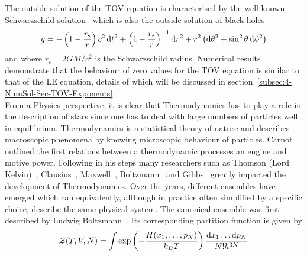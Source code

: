 The outside solution of the \ac{TOV} equation is characterised by the well known Schwarzschild solution~\cite{schwarzschildUberGravitationsfeldMassenpunktes1916} which is also the outside solution of black holes
\begin{equation}
	g=-\left(1-\frac{r_{\mathrm{s}}}{r}\right) c^{2} \mathop{}\!\mathrm{d} t^{2}+\left(1-\frac{r_{\mathrm{s}}}{r}\right)^{-1} \mathop{}\!\mathrm{d} r^{2}+r^{2}\left( \mathop{}\!\mathrm{d}\theta^2+\sin^2\theta \mathop{}\!\mathrm{d}\phi^2\right)
	\label{eq:01-Intr-Schwarzschild-Metric}
\end{equation}
and where $r_\mathrm{s}=2GM/c^2$ is the Schwarzschild radius.
Numerical results demonstrate that the behaviour of zero values for the \ac{TOV} equation is similar to that of the \ac{LE} equation, details of which will be discussed in section~\ref{subsec:4-NumSol-Sec-TOV-Exponents}.\\
From a Physics perspective, it is clear that Thermodynamics has to play a role in the description of stars since one has to deal with large numbers of particles well in equilibrium.
Thermodynamics is a statistical theory of nature and describes macroscopic phenomena by knowing microscopic behaviour of particles.
Carnot~\cite{carnotReflexionsPuissanceMotrice1824} outlined the first relations between a thermodynamic processes an engine and motive power.
Following in his steps many researchers such as Thomson (Lord Kelvin)~\cite{thomsonABSOLUTETHERMOMETRICSCALE2011}, Clausius~\cite{clausiusMechanischeWaermetheorie1876}, Maxwell~\cite{maxwellScientificLettersPapers2002}, Boltzmann~\cite{boltzmannUberMechanischeBedeutung1866} and Gibbs~\cite{gibbsElementaryPrinciplesStatistical2010} greatly impacted the development of Thermodynamics.
Over the years, different ensembles have emerged which can equivalently, although in practice often simplified by a specific choice, describe the same physical system.
The canonical ensemble was first described by Ludwig Boltzmann~\cite{boltzmannUeberEigenschaftenMonocyclischer1885a}.
Its corresponding partition function is given by
\begin{equation}
	\mathcal{Z}(T,V,N) = \int\exp\left(-\frac{H(x_1,\dots,p_N)}{k_B T}\right)\frac{\mathop{}\!\mathrm{d} x_1\dots \mathop{}\!\mathrm{d} p_N}{N!h^{3N}}
	\label{eq:01-Intr-Canocnical-Ens-Part-Funct}
\end{equation}
